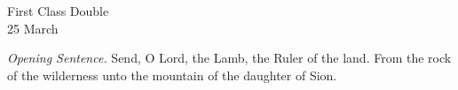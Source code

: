 

\begin{inhead}
    {First Class Double\\
25 March}
\end{inhead}
\par\noindent
\textit{Opening Sentence.} Send, O Lord, the Lamb, the Ruler of the land. From the rock of the wilderness unto the mountain of the daughter of Sion.%


